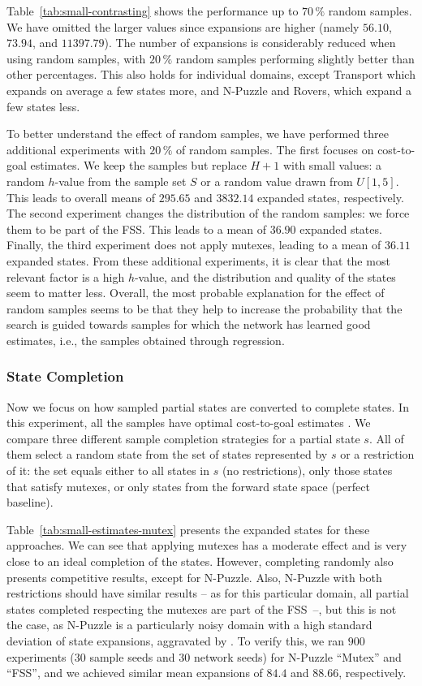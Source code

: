 

Table~\ref{tab:small-contrasting} shows the performance up to $70\,\%$ random samples. We have omitted the larger values since expansions are higher (namely $56.10$, $73.94$, and $11397.79$). The number of expansions is considerably reduced when using random samples, with $20\,\%$ random samples performing slightly better than other percentages. This also holds for individual domains, except Transport which expands on average a few states more, and N-Puzzle and Rovers, which expand a few states less.

To better understand the effect of random samples, we have performed three additional experiments with $20\,\%$ of random samples. The first focuses on cost-to-goal estimates. We keep the samples but replace $H+1$ with small values: a random $h$-value from the sample set $S$ or a random value drawn from $U[1,5]$. This leads to overall means of $295.65$ and $3832.14$ expanded states, respectively. The second experiment changes the distribution of the random samples: we force them to be part of the FSS. This leads to a mean of $36.90$ expanded states. Finally, the third experiment does not apply mutexes, leading to a mean of $36.11$ expanded states. From these additional experiments, it is clear that the most relevant factor is a high $h$-value, and the distribution and quality of the states seem to matter less. Overall, the most probable explanation for the effect of random samples seems to be that they help to increase the probability that the search is guided towards samples for which the network has learned good estimates, i.e., the samples obtained through regression.

\subsubsection{State Completion}

Now we focus on how sampled partial states are converted to complete states. In this experiment, all the samples have optimal cost-to-goal estimates \hstar. We compare three different sample completion strategies for a partial state $s$. All of them select a random state from the set of states represented by $s$ or a restriction of it: the set equals either to all states in $s$ (no restrictions), only those states that satisfy mutexes, or only states from the forward state space (perfect baseline).

Table~\ref{tab:small-estimates-mutex} presents the expanded states for these approaches. We can see that applying mutexes has a moderate effect and is very close to an ideal completion of the states. However, completing randomly also presents competitive results, except for N-Puzzle. Also, N-Puzzle with both restrictions should have similar results -- as for this particular domain, all partial states completed respecting the mutexes are part of the FSS~--, but this is not the case, as N-Puzzle is a particularly noisy domain with a high standard deviation of state expansions, aggravated by \gbfs. To verify this, we ran $900$ experiments ($30$ sample seeds and $30$ network seeds) for N-Puzzle ``Mutex'' and ``FSS'', and we achieved similar mean expansions of $84.4$ and $88.66$, respectively.

